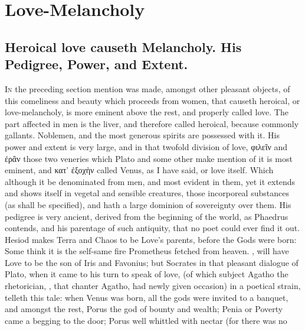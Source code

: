 \chapter{Love-Melancholy}\label{ch:love-melancholy}

\section[Heroical love]{Heroical love causeth Melancholy. His Pedigree, Power, and Extent.}\label{sec:heroical-love}

\lettrine{I}{n} the preceding section mention was made, amongst other pleasant
objects, of this comeliness and beauty which proceeds from women, that
causeth heroical, or love-melancholy, is more eminent above the rest,
and properly called love. The part affected in men is the liver, and
therefore called heroical, because commonly gallants. Noblemen, and the
most generous spirits are possessed with it. His power and extent is
very large,  and in that twofold division of love, \textgreek{φιλεῖν} and
\textgreek{ἐρᾶν} those two veneries which Plato and some other make mention
of it is most eminent, and \textgreek{κατ' ἐξοχὴν} called Venus, as I have said, or
love itself. Which although it be denominated from men, and most
evident in them, yet it extends and shows itself in vegetal and
sensible creatures, those incorporeal substances (as shall be
specified), and hath a large dominion of sovereignty over them. His
pedigree is very ancient, derived from the beginning of the world, as
Phaedrus contends, and his  parentage of such antiquity,
that no poet could ever find it out. Hesiod makes Terra and Chaos
to be Love's parents, before the Gods were born:  Some think it is the self-same fire Prometheus
fetched from heaven. , will have Love to be the
son of Iris and Favonius; but Socrates in that pleasant dialogue of
Plato, when it came to his turn to speak of love, (of which subject
Agatho the rhetorician, , that chanter Agatho, had
newly given occasion) in a poetical strain, telleth this tale: when
Venus was born, all the gods were invited to a banquet, and amongst the
rest, Porus the god of bounty and wealth; Penia or Poverty came a
begging to the door; Porus well whittled with nectar (for there was no
